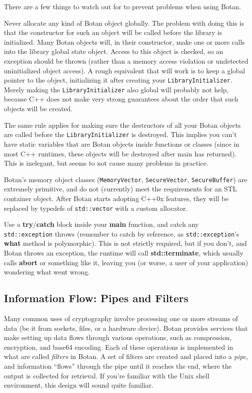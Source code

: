 \documentclass{article}
\newcommand{\function}[1]{\textbf{#1}}
\newcommand{\type}[1]{\texttt{#1}}
\begin{document}
There are a few things to watch out for to prevent problems when using Botan.

Never allocate any kind of Botan object globally. The problem with
doing this is that the constructor for such an object will be called
before the library is initialized. Many Botan objects will, in their
constructor, make one or more calls into the library global state
object. Access to this object is checked, so an exception should be
thrown (rather than a memory access violation or undetected
uninitialized object access). A rough equivalent that will work is to
keep a global pointer to the object, initializing it after creating
your \type{LibraryInitializer}. Merely making the
\type{LibraryInitializer} also global will probably not help, because
C++ does not make very strong guarantees about the order that such
objects will be created.

The same rule applies for making sure the destructors of all your
Botan objects are called before the \type{LibraryInitializer} is
destroyed. This implies you can't have static variables that are Botan
objects inside functions or classes (since in most C++ runtimes, these
objects will be destroyed after main has returned). This is inelegant,
but seems to not cause many problems in practice.

Botan's memory object classes (\type{MemoryVector},
\type{SecureVector}, \type{SecureBuffer}) are extremely primitive, and
do not (currently) meet the requirements for an STL container
object. After Botan starts adopting C++0x features, they will be
replaced by typedefs of \type{std::vector} with a custom allocator.

Use a \function{try}/\function{catch} block inside your
\function{main} function, and catch any \type{std::exception} throws
(remember to catch by reference, as \type{std::exception}'s
\function{what} method is polymorphic). This is not strictly required,
but if you don't, and Botan throws an exception, the runtime will call
\function{std::terminate}, which usually calls \function{abort} or
something like it, leaving you (or worse, a user of your application)
wondering what went wrong.

\subsection{Information Flow: Pipes and Filters}

Many common uses of cryptography involve processing one or more
streams of data (be it from sockets, files, or a hardware device).
Botan provides services that make setting up data flows through
various operations, such as compression, encryption, and base64
encoding. Each of these operations is implemented in what are called
\emph{filters} in Botan. A set of filters are created and placed into
a \emph{pipe}, and information ``flows'' through the pipe until it
reaches the end, where the output is collected for retrieval. If
you're familiar with the Unix shell environment, this design will
sound quite familiar.
\end{document}
